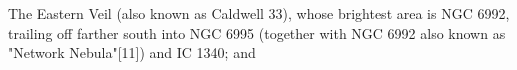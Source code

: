 The Eastern Veil (also known as Caldwell 33), whose brightest area is NGC 6992, trailing off farther south into NGC 6995 (together with NGC 6992 also known as "Network Nebula"[11]) and IC 1340; and
